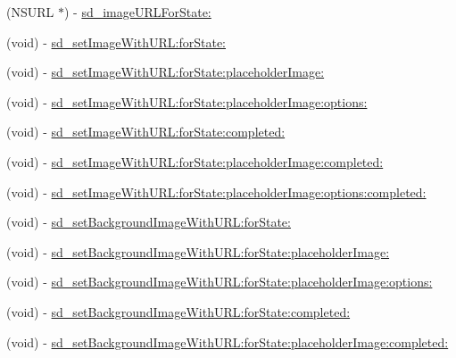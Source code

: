 \begin{DoxyCompactItemize}
\item 
(N\+S\+U\+RL $\ast$) -\/ \mbox{\hyperlink{category_u_i_button_07_web_cache_08_a980c6b65dd457fcf4498763dd3e79ff0}{sd\+\_\+image\+U\+R\+L\+For\+State\+:}}
\item 
(void) -\/ \mbox{\hyperlink{category_u_i_button_07_web_cache_08_ae6bef75306491d9a3131b5fed0f86d88}{sd\+\_\+set\+Image\+With\+U\+R\+L\+:for\+State\+:}}
\item 
(void) -\/ \mbox{\hyperlink{category_u_i_button_07_web_cache_08_a22f64e3eb00aa106685f88eb6a7bc982}{sd\+\_\+set\+Image\+With\+U\+R\+L\+:for\+State\+:placeholder\+Image\+:}}
\item 
(void) -\/ \mbox{\hyperlink{category_u_i_button_07_web_cache_08_af3a743db1d88006184aec45641c645d0}{sd\+\_\+set\+Image\+With\+U\+R\+L\+:for\+State\+:placeholder\+Image\+:options\+:}}
\item 
(void) -\/ \mbox{\hyperlink{category_u_i_button_07_web_cache_08_abddfa42effe159e9f3089c474ad9753c}{sd\+\_\+set\+Image\+With\+U\+R\+L\+:for\+State\+:completed\+:}}
\item 
(void) -\/ \mbox{\hyperlink{category_u_i_button_07_web_cache_08_a2e2e51e7a885c288be6f071be9e4b2a0}{sd\+\_\+set\+Image\+With\+U\+R\+L\+:for\+State\+:placeholder\+Image\+:completed\+:}}
\item 
(void) -\/ \mbox{\hyperlink{category_u_i_button_07_web_cache_08_a45e790aa4c92ad7038a4be0d52a75187}{sd\+\_\+set\+Image\+With\+U\+R\+L\+:for\+State\+:placeholder\+Image\+:options\+:completed\+:}}
\item 
(void) -\/ \mbox{\hyperlink{category_u_i_button_07_web_cache_08_a089b2c745708bd54f980521be6755d59}{sd\+\_\+set\+Background\+Image\+With\+U\+R\+L\+:for\+State\+:}}
\item 
(void) -\/ \mbox{\hyperlink{category_u_i_button_07_web_cache_08_a3f02643dfa92d97060eb261d7025b4ec}{sd\+\_\+set\+Background\+Image\+With\+U\+R\+L\+:for\+State\+:placeholder\+Image\+:}}
\item 
(void) -\/ \mbox{\hyperlink{category_u_i_button_07_web_cache_08_a1ef909600a987eab6fa6aaeee38f4563}{sd\+\_\+set\+Background\+Image\+With\+U\+R\+L\+:for\+State\+:placeholder\+Image\+:options\+:}}
\item 
(void) -\/ \mbox{\hyperlink{category_u_i_button_07_web_cache_08_a1c472e78e9d0fbbd9bd54b06a83813f9}{sd\+\_\+set\+Background\+Image\+With\+U\+R\+L\+:for\+State\+:completed\+:}}
\item 
(void) -\/ \mbox{\hyperlink{category_u_i_button_07_web_cache_08_a0031ef09eb759d5337914e7a5866c42f}{sd\+\_\+set\+Background\+Image\+With\+U\+R\+L\+:for\+State\+:placeholder\+Image\+:completed\+:}}

\end{DoxyCompactItemize}
